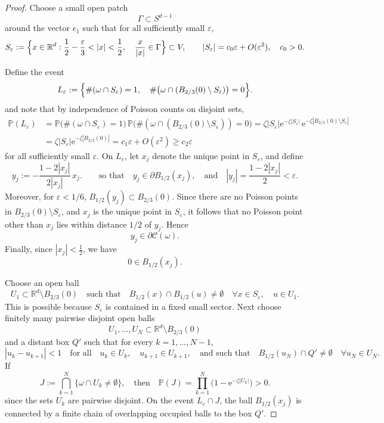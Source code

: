 \documentclass[10pt,a4paper]{amsart}
\renewcommand{\P}{\mathbb P}
\newcommand{\R}{\mathbb R}
\newcommand{\e}{\mathrm e}
\begin{document}
\begin{proof}
\medskip

Choose a small open patch
\[
\Gamma\subset S^{d-1}
\]
around the vector $e_1$ such that for all sufficiently small $\varepsilon$,
\begin{equation}\label{Seps}
S_\varepsilon
:=
\Bigl\{
x\in\mathbb R^d:
\frac12-\frac{\varepsilon}{3}<|x|<\frac12,
\quad
\frac{x}{|x|}\in\Gamma
\Bigr\}
\subset V,
\qquad
|S_\varepsilon|
=
c_0\varepsilon+O(\varepsilon^2),
\quad
c_0>0.
\end{equation}

Define the event
\[
L_\varepsilon
:=
\Bigl\{
\#(\omega\cap S_\varepsilon)=1,
\quad
\#\bigl(
\omega\cap(B_{2/3}(0)\setminus S_\varepsilon)
\bigr)=0
\Bigr\}.
\]
and note that by independence of Poisson counts on disjoint sets,
\begin{equation}\label{Leps}
\begin{aligned}
\P(L_\varepsilon)
&=
\P\bigl(
\#(\omega\cap S_\varepsilon)=1
\bigr)
\,
\P\bigl(
\#(
\omega\cap(B_{2/3}(0)\setminus S_\varepsilon)
)=0
\bigr)
=
\zeta |S_\varepsilon|
\e^{-\zeta |S_\varepsilon|}
\,
\e^{-\zeta |B_{2/3}(0)\setminus S_\varepsilon|}
\\
&=
\zeta |S_\varepsilon|
\e^{-\zeta |B_{2/3}(0)|}
=
c_1\varepsilon+O(\varepsilon^2)
\ge
c_2\varepsilon
\end{aligned}
\end{equation}
for all sufficiently small $\varepsilon$. On $L_\varepsilon$, let $x_j$ denote the unique point in $S_\varepsilon$, and define
\[
y_j
:=
-\frac{1-2|x_j|}{2|x_j|}\,x_j.
\qquad\mbox{so that}\quad 
y_j\in \partial B_{1/2}(x_j), \quad\mbox{and}\quad 
|y_j|
=
\frac{1-2|x_j|}{2}
<
\varepsilon.
\]
Moreover, for $\varepsilon<1/6$,
$B_{1/2}(y_j)\subset B_{2/3}(0)$.
Since there are no Poisson points in
$B_{2/3}(0)\setminus S_\varepsilon$,
and $x_j$ is the unique point in $S_\varepsilon$, it follows that no Poisson point other than $x_j$ lies within distance $1/2$ of $y_j$. Hence
$$y_j\in\partial\mathcal C(\omega).
$$
Finally, since $|x_j|<\frac12$,
we have
\[
0\in B_{1/2}(x_j).
\]

\medskip

Choose an open ball
\[
U_1\subset \mathbb R^d\setminus B_{2/3}(0)
\quad\mbox{such that}\quad 
B_{1/2}(x)\cap B_{1/2}(u)\neq\emptyset
\quad
\forall
x\in S_\varepsilon,
\quad
u\in U_1.
\]
This is possible because $S_\varepsilon$ is contained in a fixed small sector.
Next choose finitely many pairwise disjoint open balls
\[
U_1,\dots,U_N
\subset
\R^d\setminus B_{2/3}(0)
\]
and a distant box $Q'$ such that for every $k=1,\dots,N-1$,
\[
|u_k-u_{k+1}|<1
\quad\mbox{for all}\quad 
u_k\in U_k,
\quad
u_{k+1}\in U_{k+1},
\quad\mbox{and such that}\quad 
B_{1/2}(u_N)\cap Q'\neq\emptyset
\quad \forall u_N\in U_N.
\]
If
\begin{equation}\label{J}
J
:=
\bigcap_{k=1}^N
\{\omega\cap U_k\neq\emptyset\}, \quad\mbox{then}\quad \P(J)
=
\prod_{k=1}^N
\bigl(
1-\e^{-\zeta |U_k|}
\bigr)
>0.
\end{equation}
since the sets $U_k$ are pairwise disjoint. On the event $L_\varepsilon\cap J$, the ball
$B_{1/2}(x_j)$ is connected by a finite chain of overlapping occupied balls to the box $Q'$.


\end{proof}
\end{document}
